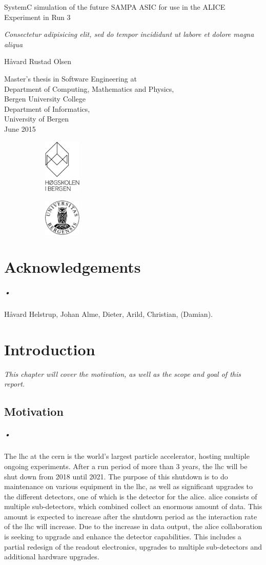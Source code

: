\documentclass[a4paper, 12pt]{report}
\newcommand*{\titlePage}{\begingroup %
\fontfamily{phv}\selectfont
\centering %

\vspace{200pt}
{\Huge SystemC simulation of the future SAMPA ASIC for use in the ALICE Experiment in Run 3} \\ %
\vspace{5pt}

{\Large \textsl{Consectetur adipisicing elit, sed do tempor incididunt ut labore et dolore magna aliqua}} %
\vspace{50pt}

{\Large{H\r{a}vard Rustad Olsen}}\\ %

\vfill %

{\Large Master's thesis in Software Engineering at \\
\vspace{10pt}
Department of Computing, Mathematics and Physics, \\
Bergen University College \\
\vspace{10pt}
Department of  Informatics, \\
University of Bergen \\}
\vspace{10pt}
{\large June 2015} %


\begin{figure}[h]
		\begin{subfigure}[]{50pt}
			\includegraphics[width=50pt]{HIB_sort_hovedlogo.eps}
		\end{subfigure}
		\hfill
		\begin{subfigure}[]{50pt}
			\includegraphics[width=50pt]{uib-logo.eps}
		\end{subfigure}

\end{figure}

\endgroup}
\begin{document}
\pagestyle{empty} %

\titlePage %

\newpage


\chapter*{Acknowledgements}

\paragraph{•}
Håvard Helstrup, Johan Alme, Dieter, Arild, Christian, (Damian).
\newpage

{}
\tableofcontents

\newpage
{}
{}
\listoffigures

\newpage
{}
{}
\listoftables

\newpage
{}
{}
\lstlistoflistings
\newpage

\printglossaries
\newpage
\pagestyle{fancy}
\chapter{Introduction}
\textit{This chapter will cover the motivation, as well as the scope and goal of this report.}

\section{Motivation}
\label{sec:motivation}
\paragraph{•}
The \gls{lhc} at the \gls{cern} is the world's largest particle accelerator, hosting multiple ongoing experiments.
After a run period of more than 3 years, the \gls{lhc} will be shut down from 2018 until 2021.\cite{ls2}
The purpose of this shutdown is to do maintenance on various equipment in the \gls{lhc}, as well as significant upgrades to the different detectors, one of which is the detector for the \gls{alice}.
\gls{alice} consists of multiple sub-detectors, which combined collect an enormous amount of data.
This amount is expected to increase after the shutdown period as the interaction rate of the \gls{lhc} will increase.
Due to the increase in data output, the \gls{alice} collaboration is seeking to upgrade and enhance the detector capabilities.\cite{alice-upgrade}
This includes a partial redesign of the readout electronics, upgrades to multiple sub-detectors and additional hardware upgrades.
\end{document}
